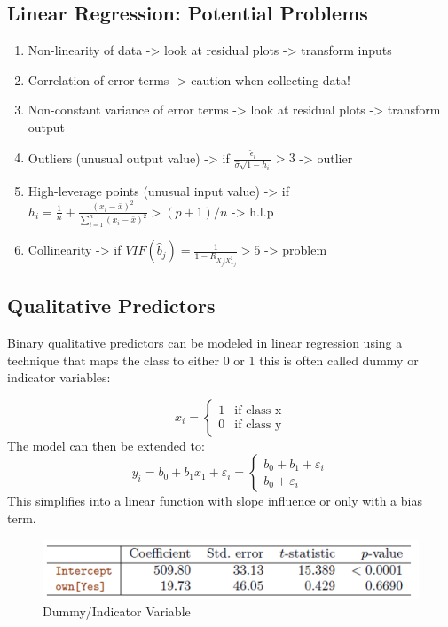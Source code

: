 \documentclass[../Main.tex]{subfiles}
\begin{document}
\subsection{Linear Regression: Potential Problems}
\begin{enumerate}
    \item Non-linearity of data -> look at residual plots -> transform inputs
    \item Correlation of error terms -> caution when collecting data!
    \item Non-constant variance of error terms -> look at residual plots -> transform output
    \item Outliers (unusual output value) -> if \(\frac{\hat{\epsilon}_i}{\hat{\sigma}\sqrt{1-h_i}}>3\) -> outlier
    \item High-leverage points (unusual input value) -> if \(h_i = \frac{1}{n} + \frac{(x_i - \bar{x})^2}{\sum_{i=1}^{n} (x_i - \bar{x})^2} > (p+1)/n\) -> h.l.p
    \item Collinearity -> if \(VIF(\hat{b}_j) = \frac{1}{1-R_{X_j|X_{-j}^2}}>5\) -> problem
\end{enumerate}

\subsection{Qualitative Predictors}
Binary qualitative predictors can be modeled in linear regression using a technique that maps
the class to either 0 or 1 this is often called dummy or indicator variables:

\begin{equation}
    x_i = \begin{cases}
        1 & \text{if class x}\\
        0 & \text{if class y}
    \end{cases}
\end{equation}
The model can then be extended to:
\begin{equation}
    y_i = b_0 + b_1 x_1 + \varepsilon_i = \begin{cases}
        b_0 + b_1 + \varepsilon_i \\
        b_0 + \varepsilon_i 
    \end{cases}
\end{equation}
This simplifies into a linear function with slope influence or only with a bias term.

\begin{figure}[H]
    \centering
    \includegraphics[width=0.75\linewidth]{Images/indicator-function.png}
    \caption{Dummy/Indicator Variable}
\end{figure}
\end{document}
